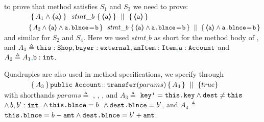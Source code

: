 \vspace{.1cm}
\Eg to prove  that method  satisfies  {$S_1$ and $S_3$}  we  need to prove:
\\
$\strut \ \ \ \ \ \ \ \ \ \ \ \quadruple {A_1  \wedge \inside{\prg{a}} } {\ stmt\_b  \ } {\inside{\prg{a}}} { \inside{\prg{a}}} $
\\
$\strut \ \ \ \ \ \  \ \  \ \ \   \quadruple {A_2  \wedge  \inside{\prg{a}} \wedge  \prg{a.\balance}\!=\!{\prg{b}} } {\   stmt\_b  \  } {\inside{\prg{a}} \wedge  \prg{a.\balance}\!=\!\prg{b}}   
                         {  \inside{\prg{a}} \wedge  \prg{a.\balance}\!=\!\prg{b} }$
\\
and similar for {$S_2$ and $S_4$}. Here we used   $stmt\_b$  as short for the method body of , and $A_1 \triangleq \mbox{\normalfont{\texttt{this}}}:\mbox{\normalfont{\texttt{Shop}}}, \mbox{\normalfont{\texttt{buyer}}}:\mbox{\normalfont{\texttt{external}}}, \mbox{\normalfont{\texttt{anItem}}}:\mbox{\normalfont{\texttt{Item}}}{\color{teal}{,}}\mbox{\normalfont{\texttt{a}}}:\mbox{\normalfont{\texttt{Account}}}$
and $A_2 \triangleq A_1{\color{teal}{,}} \mbox{\normalfont{\texttt{b}}}:\mbox{\normalfont{\texttt{int}}}$.
 
 \vspace{.2cm}
Quadruples are also used in method specifications, \eg we specify  through
\\
$\strut \ \ \ \ \ \  \ \  \ \ \  { \mprepostLongN {A_3}{\prg{public}\ \prg{Account}}{\prg{transfer}}{params}{A_4} {true} }$
\\
with shorthands  $params \triangleq$ , , , and 
$A_3  \triangleq$  $\mbox{\normalfont{\texttt{key'}}}=\mbox{\normalfont{\texttt{this.key}}} \wedge \mbox{\normalfont{\texttt{dest}}}\neq \mbox{\normalfont{\texttt{this}}}$
$\wedge\, b, b':\mbox{\normalfont{\texttt{int}}}$
$\, \wedge\, \mbox{\normalfont{\texttt{this.\mbox{\normalfont{\texttt{blnce}}}}}}=b$ 
$\, \wedge\,  \mbox{\normalfont{\texttt{dest.\mbox{\normalfont{\texttt{blnce}}}}}}=b'$, 
 and $A_4 \triangleq$  
 $\mbox{\normalfont{\texttt{this.\mbox{\normalfont{\texttt{blnce}}}}}}=b-\mbox{\normalfont{\texttt{amt}}} \wedge \mbox{\normalfont{\texttt{dest.\mbox{\normalfont{\texttt{blnce}}}}}}=b'+\mbox{\normalfont{\texttt{amt}}}$.

